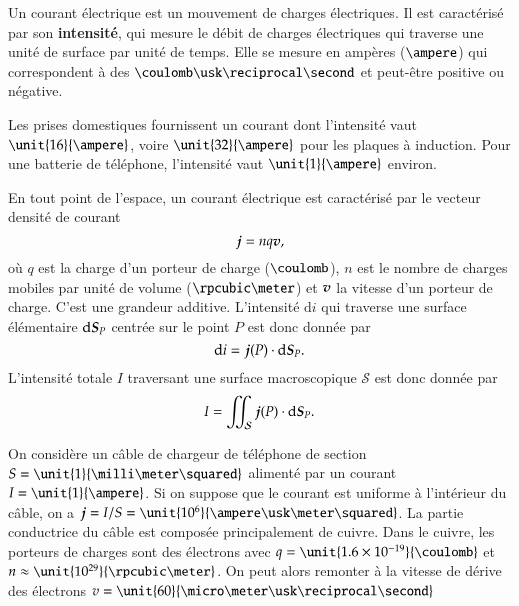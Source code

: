 \begin{defn}
Un courant électrique est un mouvement de charges électriques. Il est caractérisé 
par son \textbf{intensité}, qui mesure le débit de charges électriques qui traverse
une unité de surface par unité de temps. Elle se mesure en ampères ($\ampere$)
qui correspondent à des $\coulomb \usk \reciprocal \second$ et peut-être 
positive ou négative.
\end{defn}

\begin{exemple}
	Les prises domestiques fournissent un courant dont l'intensité vaut
	$\unit{16}{\ampere}$, voire $\unit{32}{\ampere}$ pour les plaques à induction. 
	Pour une batterie de téléphone, l'intensité vaut
	$\unit{1}{\ampere}$ environ.
\end{exemple}

\begin{defn}
	En tout point de l'espace, un courant électrique est caractérisé par le vecteur 
densité de courant  
	\begin{equation}
		\vecj = n q \vecv,
		\label{eq:jnqv}
	\end{equation}
	où $q$ est la charge d'un porteur de charge ($\coulomb$), $n$ est le
	nombre de charges mobiles par unité de volume ($\rpcubic \meter$) et
	$\vecv$ la vitesse d'un porteur de charge. C'est une grandeur additive.
	L'intensité $\mathrm{d}i$
	qui traverse une surface élémentaire $\ds_P$ centrée sur le point 
	$P$ est donc donnée par 
	\begin{equation}
		\mathrm{d}i = \vecj(P) \cdot \ds_P.
	\end{equation}
	L'intensité totale $I$ traversant une surface macroscopique $\mathcal{S}$
	est donc donnée par 
	\begin{equation}
		I = \iint_\mathcal{S} \vecj(P) \cdot \ds_P.
	\end{equation}
\end{defn}

\begin{exemple}
	On considère un câble de chargeur de téléphone de section $S = \unit{1}
	{\milli \meter \squared}$ alimenté par un courant $I = \unit{1}{\ampere}$.
	Si on suppose que le courant est uniforme à l'intérieur du câble, on a
	$\vecj = I/S = \unit{10^6}{\ampere \usk \meter \squared}$. La partie 
	conductrice du câble est composée principalement de cuivre. Dans le cuivre, 
	les porteurs de charges sont des électrons avec $q = \unit{1.6 \times 10^{-19}
	}{\coulomb}$ et $n \approx \unit{10^{29}}{\rpcubic \meter}$. On peut alors remonter
	à la vitesse de dérive des électrons $v = \unit{60}
	{\micro \meter \usk \reciprocal \second}$
\end{exemple}

